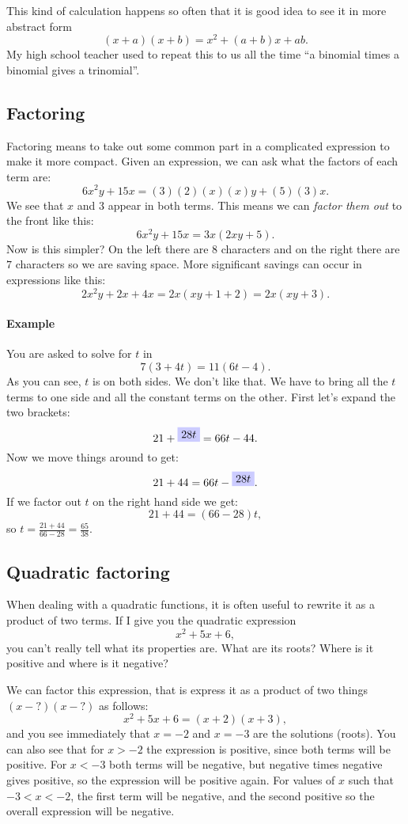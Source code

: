 \documentclass[twocolumn,8pt]{extarticle}
\newcommand{\dokutitleleveltree}[1]{\subsection{#1}}
\newcommand{\dokutitlelevelfive}[1]{\paragraph{#1}}
\newcommand{\dokuitalic}[1]{\textsl{#1}}
\begin{document}
This kind of calculation happens so often that it is
good idea to see it in more abstract form
\[
  (x+a)(x+b) = x^2 + (a+b)x + ab.
\]
My high school teacher used to repeat this to us all
the time ``a binomial times a binomial gives a trinomial''.


\dokutitleleveltree{Factoring}
\label{bd72fce91eca7fd86b64fe98d212427e}%

Factoring means to take out some common part in a
complicated expression to make it more compact.
Given an expression, we can ask what the 
factors of each term are:
\[
  6x^2y + 15x =   (3)(2)(x)(x)y + (5)(3)x.
\]
We see that \(x\) and \(3\) appear in both terms.
This means we can \dokuitalic{factor them out} to the front
like this:
\[
 6x^2y + 15x =  3x(2xy+5).
\]
Now is this simpler? 
On the left there are \(8\) characters and on the 
right there are \(7\) characters so we are saving space.
More significant savings can occur in expressions like this:
\[
  2x^2y + 2x + 4x = 2x(xy+1+2) =  2x(xy+3).
\]


\dokutitlelevelfive{Example}

You are asked to solve for \(t\) in 
\[
 7(3 + 4t) = 11(6t - 4).
\]
As you can see, \(t\) is on both sides. We don't like that.
We have to bring all the \(t\) terms to one side and all the
constant terms on the other.
First let's expand the two brackets:
\[
 21 + \tikz[remember picture] \node[fill=blue!20] (n2) {$28t$};  = 66t - 44.
\]
Now we move things around to get:
\[
 21 + 44 = 66t -  \tikz[remember picture] \node[fill=blue!20] (n2bis) {$28t$};  .
\]
If we factor out \(t\) on the right hand side we get:
\[
 21 + 44 = (66 - 28)t,
\]
so \(t = \frac{21 + 44}{66 - 28} = \frac{65}{38}\).


\dokutitleleveltree{Quadratic factoring}
\label{231e44a9b24528f89d83cbc42d87e094}%

When dealing with a quadratic functions, it is often
useful to rewrite it as a product of two terms.
If I give you the quadratic expression
\[
  x^2+5x+6,
\]
you can't really tell what its properties are.
What are its roots? Where is it positive and where is it negative?

We can factor this expression, that is express it as a product of two things \((x-?)(x-?)\)
as follows:
\[
  x^2+5x+6 = (x+2)(x+3),
\]
and you see immediately that \(x=-2\) and \(x=-3\) are the solutions (roots).
You can also see that for \(x>-2\) the expression is positive, since 
both terms will be positive. For \(x< -3\) both terms will be negative, but
negative times negative gives positive, so the expression will be positive again.
For values of \(x\) such that \(-3<x< -2\), the first term will be negative, and
the second positive so the overall expression will be negative.
\end{document}
